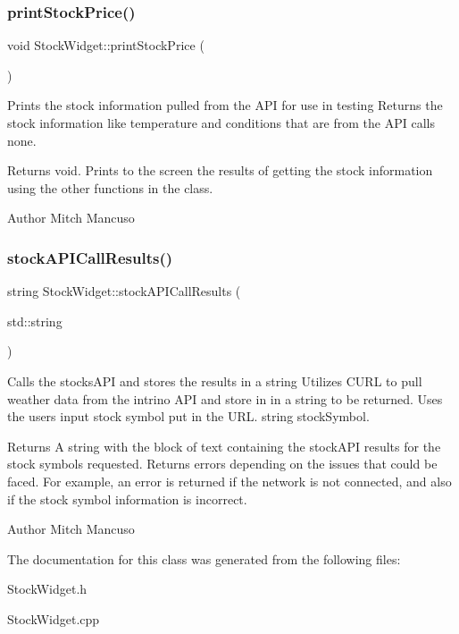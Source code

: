 \subsubsection{\texorpdfstring{print\+Stock\+Price()}{printStockPrice()}}
{\footnotesize\ttfamily void Stock\+Widget\+::print\+Stock\+Price (\begin{DoxyParamCaption}{ }\end{DoxyParamCaption})}



Prints the stock information pulled from the A\+PI for use in testing  Returns the stock information like temperature and conditions that are from the A\+PI calls  none. 

\begin{DoxyReturn}{Returns}
void. Prints to the screen the results of getting the stock information using the other functions in the class. 
\end{DoxyReturn}
\begin{DoxyAuthor}{Author}
Mitch Mancuso 
\end{DoxyAuthor}
\mbox{\label{class_stock_widget_af1da71cd53153f27818aa6afb94cb50b}} 
\subsubsection{\texorpdfstring{stock\+A\+P\+I\+Call\+Results()}{stockAPICallResults()}}
{\footnotesize\ttfamily string Stock\+Widget\+::stock\+A\+P\+I\+Call\+Results (\begin{DoxyParamCaption}\item[{std\+::string}]{ }\end{DoxyParamCaption})}



Calls the stocks\+A\+PI and stores the results in a string  Utilizes C\+U\+RL to pull weather data from the intrino A\+PI and store in in a string to be returned. Uses the user\textquotesingle{}s input stock symbol put in the U\+RL.  string stock\+Symbol. 

\begin{DoxyReturn}{Returns}
A string with the block of text containing the stock\+A\+PI results for the stock symbols requested. Returns errors depending on the issues that could be faced. For example, an error is returned if the network is not connected, and also if the stock symbol information is incorrect. 
\end{DoxyReturn}
\begin{DoxyAuthor}{Author}
Mitch Mancuso 
\end{DoxyAuthor}


The documentation for this class was generated from the following files\+:\begin{DoxyCompactItemize}
\item 
Stock\+Widget.\+h\item 
Stock\+Widget.\+cpp\end{DoxyCompactItemize}
